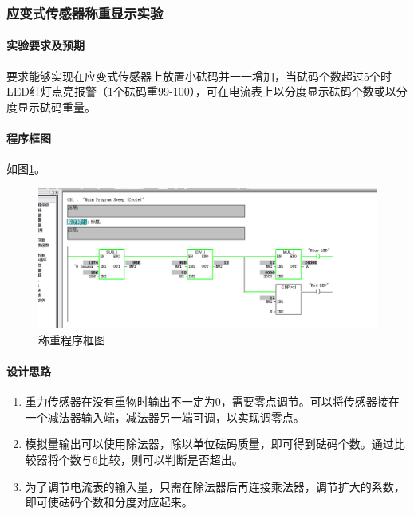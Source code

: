 \subsubsection{应变式传感器称重显示实验}
\paragraph{实验要求及预期} 要求能够实现在应变式传感器上放置小砝码并一一增加，当砝码个数超过5个时LED红灯点亮报警（1个砝码重99-100），可在电流表上以分度显示砝码个数或以分度显示砝码重量。

\paragraph{程序框图} 如图\ref{fig:calculate}。

\begin{figure}[htbp]
\centering
\includegraphics[width=13cm]{resource/program_calculate.png}
\caption{称重程序框图}
\label{fig:calculate}
\end{figure}

\paragraph{设计思路}
\begin{enumerate}
\item 重力传感器在没有重物时输出不一定为0，需要零点调节。可以将传感器接在一个减法器输入端，减法器另一端可调，以实现调零点。
\item 模拟量输出可以使用除法器，除以单位砝码质量，即可得到砝码个数。通过比较器将个数与6比较，则可以判断是否超出。
\item 为了调节电流表的输入量，只需在除法器后再连接乘法器，调节扩大的系数，即可使砝码个数和分度对应起来。
\end{enumerate}



